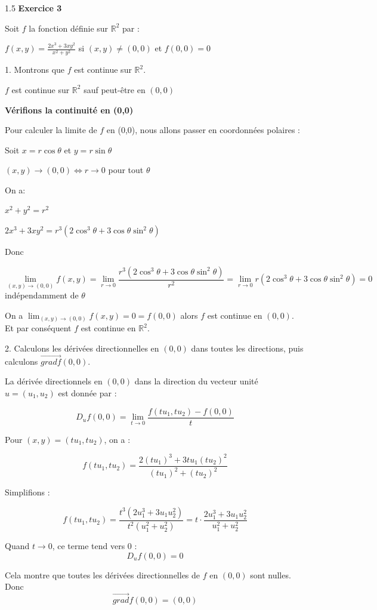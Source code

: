 \documentclass[12pt]{article}
\begin{document}
\begin{spacing}{1.5}
\medskip\textbf{Exercice 3}

Soit $f$ la fonction définie sur $\mathbb{R}^2$ par :
 
 $
 f(x,y) = \frac{2x^3+3xy^2}{x^2+y^2}$ si $(x,y)\neq (0,0)$ et $f(0,0) = 0$
 
 1. Montrons que $f$ est continue sur $\mathbb{R}^2$.
 
 $f$ est continue sur $\mathbb{R}^2$ sauf peut-être en $(0,0)$
 
 \medskip\textbf{Vérifions la continuité en (0,0)}
 
 Pour calculer la limite de $f$ en (0,0), nous allons passer en coordonnées polaires : 
 
 Soit $x=r\cos\theta$ et $y=r\sin\theta$
 
 $(x,y)\to (0,0)\Leftrightarrow r\to 0$ pour tout $\theta$
 
 On a:
 
 $x^2+y^2=r^2$
 
 $2x^3+3xy^2=r^3(2\cos^3\theta+3\cos\theta\sin^2\theta)$
 
 Donc
 
\[
\lim_{(x,y)\to (0,0)}f(x,y)=\lim_{r\to 0}\frac{r^3(2\cos^3\theta+3\cos\theta\sin^2\theta)}{r^2}=\lim_{r\to 0}r(2\cos^3\theta+3\cos\theta\sin^2\theta)=0\] indépendamment de $\theta$

On a $\lim_{(x,y)\to (0,0)}f(x,y)=0=f(0,0)$ alors $f$ est continue en $(0,0)$. Et par conséquent $f$ est continue en $\mathbb{R}^2$.
 

 2. Calculons les dérivées directionnelles en $(0,0)$ dans toutes les directions, puis calculons $\overrightarrow{gradf}(0,0)$.
 
 La dérivée directionnels en $(0,0)$ dans la direction du vecteur unité $u=(u_1,u_2)$ est donnée par :
 
 \[
 D_uf(0,0)=\lim_{t\to 0}\frac{f(tu_1,tu_2)-f(0,0)}{t}\]
 
 Pour $(x,y)=(tu_1,tu_2)$, on a :
 
 \[
 f(tu_1,tu_2) = \frac{2(tu_1)^3+3tu_1(tu_2)^2}{(tu_1)^2+(tu_2)^2}\]
 
 Simplifions :
 
 \[
 f(tu_1,tu_2) = \frac{t^3(2u_1^3+3u_1u_2^2)}{t^2(u_1^2+u_2^2)}=t\cdot\frac{2u_1^3+3u_1u_2^2}{u_1^2+u_2^2}\]
 
 Quand $t\to 0$, ce terme tend vers 0 : 
 \[D_uf(0,0)=0\]
 
 Cela montre que toutes les dérivées directionnelles de $f$ en $(0,0)$ sont nulles. Donc \[\overrightarrow{grad}f(0,0)=(0,0)\]
 

\end{spacing}
\end{document}
